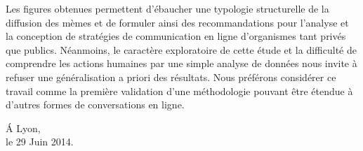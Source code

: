 \documentclass[12pt,a4paper]{article} %
\begin{document}
\begin{spacing}{1.5}
Les figures obtenues permettent d’ébaucher une typologie structurelle de la diffusion des mèmes et de formuler ainsi des recommandations pour l’analyse et la conception de stratégies de communication en ligne d’organismes tant privés que publics. Néanmoins, le caractère exploratoire de cette étude et la difficulté de comprendre les actions humaines par une simple analyse de données nous invite à refuser une généralisation a priori des résultats. Nous préférons considérer ce travail comme la première validation d’une méthodologie pouvant être étendue à d’autres formes de conversations en ligne.

\end{spacing}



\begin{flushright}
    \'A Lyon, \\
    le 29 Juin 2014.
\end{flushright}
\end{document}
